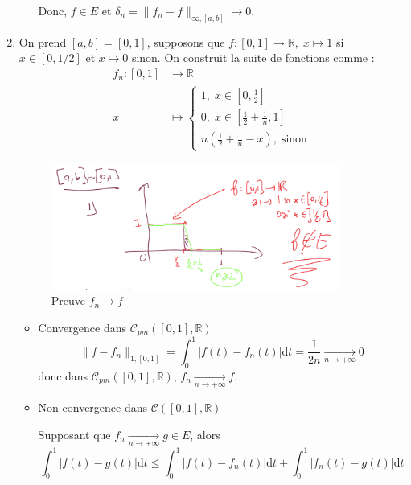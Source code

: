 \begin{myproof}{}{}
\begin{enumerate}
\begin{itemize}
        Donc, $f\in E$ et $\delta_n  = \| f_n - f \| _{\infty, [a,b]}\to 0$.
    \end{itemize}
  \item On prend $[a,b] = [0,1]$, supposons que $f:[0,1]\to \mathbb{R},\; x \mapsto 1$ si $x\in [0, 1/2]$ et $x \mapsto 0$ sinon. On construit la suite de fonctions comme : 
    \begin{align*}
      f_n : [0, 1] &\to \mathbb{R} \\ 
            x &\mapsto \begin{cases}
              1, \; x \in \left[0, \frac{1}{2}\right] \\ 
              0, \; x \in \left[\frac{1}{2} + \frac{1}{n} , 1\right]\\ 
              n\left( \frac{1}{2} + \frac{1}{n} - x\right), \; \text{sinon}
            \end{cases}
    \end{align*}
\begin{figure}[H] %
  \centering
  \includegraphics[width=0.9\textwidth]{./assets/Preuve-fn-f.png}
  \caption{Preuve-$f_n \to f$}
  \label{fig:Preuve-fn-f}
\end{figure}
\begin{itemize}

  \item Convergence dans $\mathcal{C} _{pm} ([0,1], \mathbb{R})$
\[
  \| f - f_n \| _{1, [0,1]} = \int _0 ^{1} |f(t) - f_n(t) | \mathrm{d} t = \frac{1}{2n}  \underset{n \to + \infty}{\longrightarrow}  0
\]
donc dans $\mathcal{C } _{pm} ([0,1], \mathbb{R})$, $f_n \underset{n \to + \infty}{\longrightarrow} f$.

\item Non convergence dans $\mathcal{C}([0,1],\mathbb{R})$

  Supposant que $f_n \underset{n \to + \infty}{\longrightarrow} g \in E$, alors 
  \[
    \int _0 ^{1} |f(t) -g(t) | \mathrm{d} t \le \int_{0}^{1}|f(t) - f_n(t) | \mathrm{d} t + \int_{0}^{1} | f_n(t) - g(t) | \mathrm{d}t
  \]


\end{itemize}
\end{enumerate}
\end{myproof}
